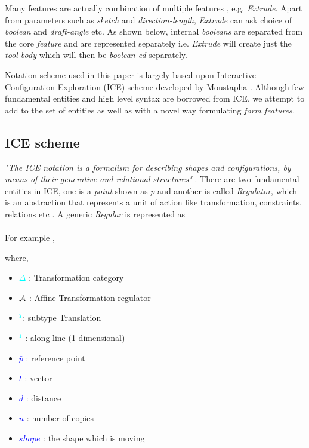 Many features are actually combination of multiple features , e.g. {\em  Extrude}. Apart from parameters such as {\em sketch} and {\em direction-length},  {\em  Extrude} can ask choice of {\em boolean} and {\em draft-angle} etc. As shown below, internal {\em booleans} are separated from the core {\em feature} and are represented separately  i.e. {\em Extrude} will create just the {\em tool body} which will then be {\em boolean-ed} separately.

Notation scheme used in this paper is largely based upon Interactive Configuration Exploration  (ICE) scheme developed by Moustapha \cite{Hoda2005}. Although few fundamental entities and high level syntax are borrowed from ICE, we attempt to add to the set of entities as well as with a novel way formulating {\em form features}.

\subsection{ICE scheme}
{\em "The ICE notation is a formalism for describing shapes and  configurations,  by  means  of  their  generative  and  relational  structures"} \cite{Hoda2005}.  There are two fundamental entities in ICE, one is a {\em point} shown as $\bar{p}$ and another is called {\em Regulator}, which is an abstraction that represents a unit of action like transformation, constraints, relations etc . A generic {\em Regular} is represented as \\

{}\\

	 For example ,

	
	where,
		\begin{itemize}[noitemsep,topsep=0pt,parsep=0pt,partopsep=0pt,label={}]
		\item 	\textcolor{cyan}{$\Delta$} : Transformation category
	     	\item 	\textcolor{cyan}{${\bf \mathcal{A}}$} : Affine Transformation regulator
		\item  	\textcolor{cyan}{$^T$}: subtype Translation
		 \item 	\textcolor{cyan}{$^1$} : along line (1 dimensional)
	        \item 	\textcolor{blue}{ $\bar{p}$} : reference point
  		\item  	\textcolor{blue}{$\bar{t}$} : vector
		\item   	\textcolor{blue}{$d$} : distance
		 \item  	\textcolor{blue}{$n$} : number of copies
		 \item  	\textcolor{blue}{$shape$} : the shape which is moving
		\end{itemize}

